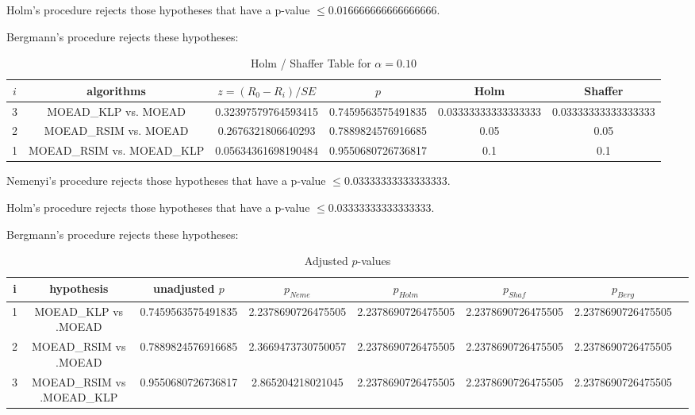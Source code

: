 \documentclass[a4paper,10pt]{article}
\begin{document}
\begin{landscape}
Holm's procedure rejects those hypotheses that have a p-value $\le0.016666666666666666$.


Bergmann's procedure rejects these hypotheses:


\begin{itemize}


\end{itemize}


\begin{table}[!htp]
\centering\tiny
\caption{Holm / Shaffer Table for $\alpha=0.10$}
\begin{tabular}{cccccc}
$i$&algorithms&$z=(R_0 - R_i)/SE$&$p$&Holm&Shaffer\\
\hline
3&MOEAD_KLP vs. MOEAD&0.32397579764593415&0.7459563575491835&0.03333333333333333&0.03333333333333333\\
2&MOEAD_RSIM vs. MOEAD&0.2676321806640293&0.7889824576916685&0.05&0.05\\
1&MOEAD_RSIM vs. MOEAD_KLP&0.05634361698190484&0.9550680726736817&0.1&0.1\\
\hline
\end{tabular}
\end{table}
Nemenyi's procedure rejects those hypotheses that have a p-value $\le0.03333333333333333$.


Holm's procedure rejects those hypotheses that have a p-value $\le0.03333333333333333$.


Bergmann's procedure rejects these hypotheses:


\begin{itemize}


\end{itemize}


\begin{table}[!htp]
\centering\tiny
\caption{Adjusted $p$-values}
\begin{tabular}{cccccccc}
i&hypothesis&unadjusted $p$&$p_{Neme}$&$p_{Holm}$&$p_{Shaf}$&$p_{Berg}$\\
\hline
1&MOEAD_KLP vs .MOEAD&0.7459563575491835&2.2378690726475505&2.2378690726475505&2.2378690726475505&2.2378690726475505\\
2&MOEAD_RSIM vs .MOEAD&0.7889824576916685&2.3669473730750057&2.2378690726475505&2.2378690726475505&2.2378690726475505\\
3&MOEAD_RSIM vs .MOEAD_KLP&0.9550680726736817&2.865204218021045&2.2378690726475505&2.2378690726475505&2.2378690726475505\\
\hline
\end{tabular}
\end{table}

\end{landscape}
\end{document}
